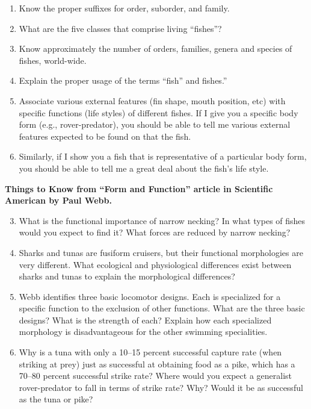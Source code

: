 \documentclass[nofonts, letterpaper]{tufte-handout}
\begin{document}
\begin{enumerate}
	\item Know the proper suffixes for order, suborder, and family.

	\item What are the five classes that comprise living “fishes”?

	\item Know approximately the number of orders, families, genera and species of fishes, world-wide.

	\item Explain the proper usage of the terms “fish” and fishes.”

	\item Associate various external features (fin shape, mouth position, etc) with specific functions (life styles) of different fishes.  If I give you a specific body form (e.g., rover-predator), you should be able to tell me various external features expected to be found on that the fish.
	
	\item Similarly, if I show you a fish that is representative of a particular body form, you should be able to tell me a great deal about the fish’s life style.  
\end{enumerate}

\noindent\textbf{Things to Know from “Form and Function” article in Scientific American by Paul Webb.}

\begin{enumerate}
	\setcounter{enumi}{2}
	\item What is the functional importance of narrow necking?  In what types of fishes would you expect to find it?  What forces are reduced by narrow necking?
	
	\item Sharks and tunas are fusiform cruisers, but their functional morphologies are very different.  What ecological and physiological differences exist between sharks and tunas to explain the morphological differences?
	
	\item Webb identifies three basic locomotor designs.  Each is specialized for a specific function to the exclusion of other functions.  What are the three basic designs?  What is the strength of each?  Explain how each specialized morphology is disadvantageous for the other swimming specialities.
	
	\item Why is a tuna with only a 10--15 percent successful capture rate (when striking at prey) just as successful at obtaining food as a pike, which has a 70--80 percent successful strike rate?  Where would you expect a generalist rover-predator to fall in terms of strike rate?  Why?  Would it be as successful as the tuna or pike?
\end{enumerate}
\end{document}

